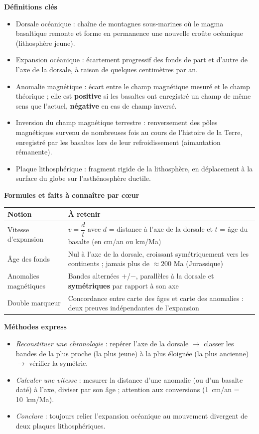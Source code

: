 \documentclass[11pt]{article}
\newcommand{\cle}[1]{{\popxbold\color{popdark}#1}}
\begin{document}
\begin{bilan}
\textbf{Définitions clés}
\begin{itemize}
  \item \cle{Dorsale océanique} : chaîne de montagnes sous-marines où le magma basaltique remonte et forme en permanence une nouvelle croûte océanique (lithosphère jeune).
  \item \cle{Expansion océanique} : écartement progressif des fonds de part et d'autre de l'axe de la dorsale, à raison de quelques centimètres par an.
  \item \cle{Anomalie magnétique} : écart entre le champ magnétique mesuré et le champ théorique ; elle est \textbf{positive} si les basaltes ont enregistré un champ de même sens que l'actuel, \textbf{négative} en cas de champ inversé.
  \item \cle{Inversion du champ magnétique terrestre} : renversement des pôles magnétiques survenu de nombreuses fois au cours de l'histoire de la Terre, enregistré par les basaltes lors de leur refroidissement (aimantation rémanente).
  \item \cle{Plaque lithosphérique} : fragment rigide de la lithosphère, en déplacement à la surface du globe sur l'asthénosphère ductile.
\end{itemize}

\textbf{Formules et faits à connaître par cœur}
\begin{center}
\begin{tabularx}{\linewidth}{|l|X|}
\hline
\rowcolor{popblueL} \textbf{Notion} & \textbf{À retenir} \\
\hline
Vitesse d'expansion & $v = \dfrac{d}{t}$ avec $d$ = distance à l'axe de la dorsale et $t$ = âge du basalte (en cm/an ou km/Ma) \\
\hline
Âge des fonds & Nul à l'axe de la dorsale, croissant symétriquement vers les continents ; jamais plus de $\approx 200$ Ma (Jurassique) \\
\hline
Anomalies magnétiques & Bandes alternées $+$/$-$, parallèles à la dorsale et \textbf{symétriques} par rapport à son axe \\
\hline
Double marqueur & Concordance entre carte des âges et carte des anomalies : deux preuves indépendantes de l'expansion \\
\hline
\end{tabularx}
\end{center}

\textbf{Méthodes express}
\begin{itemize}
  \item \emph{Reconstituer une chronologie} : repérer l'axe de la dorsale $\rightarrow$ classer les bandes de la plus proche (la plus jeune) à la plus éloignée (la plus ancienne) $\rightarrow$ vérifier la symétrie.
  \item \emph{Calculer une vitesse} : mesurer la distance d'une anomalie (ou d'un basalte daté) à l'axe, diviser par son âge ; attention aux conversions (\SI{1}{cm/an} = \SI{10}{km/Ma}).
  \item \emph{Conclure} : toujours relier l'expansion océanique au mouvement divergent de deux plaques lithosphériques.
\end{itemize}
\end{bilan}
\end{document}
